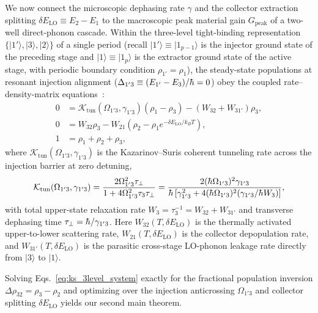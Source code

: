 \documentclass[11pt,letterpaper]{article}
\renewcommand{\hbar}{\mathchar'26\mkern-9mu h}
\begin{document}
We now connect the microscopic dephasing rate $\gamma$ and the collector extraction splitting $\delta E_{\mathrm{LO}} \equiv E_2 - E_1$ to the macroscopic peak material gain $G_{\mathrm{peak}}$ of a two-well direct-phonon cascade. Within the three-level tight-binding representation $\{|1'\rangle, |3\rangle, |2\rangle\}$ of a single period (recall $|1'\rangle \equiv |1_{p-1}\rangle$ is the injector ground state of the preceding stage and $|1\rangle \equiv |1_p\rangle$ is the extractor ground state of the active stage, with periodic boundary condition $\rho_{1'} = \rho_1$), the steady-state populations at resonant injection alignment ($\Delta_{1'3} \equiv (E_{1'} - E_3)/\hbar = 0$) obey the coupled rate--density-matrix equations~\cite{Kazarinov1972,Terazzi2010,Vurgaftman2021}:
\begin{subequations}
\label{eq:ks_3level_system}
\begin{align}
0 &= \mathcal{K}_{\mathrm{tun}}(\Omega_{1'3}, \gamma_{1'3})(\rho_1 - \rho_3) - (W_{32} + W_{31'})\rho_3, \label{eq:ks_3a}\\
0 &= W_{32}\rho_3 - W_{21}\left(\rho_2 - \rho_1 e^{-\delta E_{\mathrm{LO}}/k_B T}\right), \label{eq:ks_3b}\\
1 &= \rho_1 + \rho_2 + \rho_3, \label{eq:ks_3c}
\end{align}
\end{subequations}
where $\mathcal{K}_{\mathrm{tun}}(\Omega_{1'3}, \gamma_{1'3})$ is the Kazarinov--Suris coherent tunneling rate across the injection barrier at zero detuning,
\begin{equation}
\mathcal{K}_{\mathrm{tun}}(\Omega_{1'3}, \gamma_{1'3}) = \frac{2\Omega_{1'3}^2 \tau_\perp}{1 + 4\Omega_{1'3}^2 \tau_3 \tau_\perp} = \frac{2(\hbar\Omega_{1'3})^2 \gamma_{1'3}}{\hbar\left[\gamma_{1'3}^2 + 4(\hbar\Omega_{1'3})^2 (\gamma_{1'3}/\hbar W_3)\right]},
\label{eq:k_tun_def}
\end{equation}
with total upper-state relaxation rate $W_3 = \tau_3^{-1} = W_{32} + W_{31'}$ and transverse dephasing time $\tau_\perp = \hbar/\gamma_{1'3}$. Here $W_{32}(T, \delta E_{\mathrm{LO}})$ is the thermally activated upper-to-lower scattering rate, $W_{21}(T, \delta E_{\mathrm{LO}})$ is the collector depopulation rate, and $W_{31'}(T, \delta E_{\mathrm{LO}})$ is the parasitic cross-stage LO-phonon leakage rate directly from $|3\rangle$ to $|1\rangle$.

Solving Eqs.~\eqref{eq:ks_3level_system} exactly for the fractional population inversion $\Delta\rho_{32} = \rho_3 - \rho_2$ and optimizing over the injection anticrossing $\Omega_{1'3}$ and collector splitting $\delta E_{\mathrm{LO}}$ yields our second main theorem.
\end{document}
